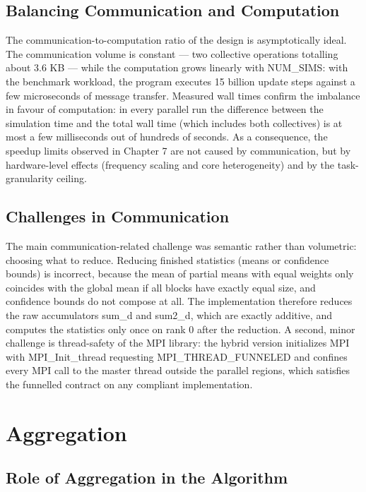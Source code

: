 \documentclass[12pt,a4paper]{article}
\begin{document}
\subsection{Balancing Communication and Computation}

The communication-to-computation ratio of the design is asymptotically
ideal. The communication volume is constant --- two collective
operations totalling about 3.6 KB --- while the computation grows
linearly with NUM\_SIMS: with the benchmark workload, the program
executes 15 billion update steps against a few microseconds of message
transfer. Measured wall times confirm the imbalance in favour of
computation: in every parallel run the difference between the simulation
time and the total wall time (which includes both collectives) is at
most a few milliseconds out of hundreds of seconds. As a consequence,
the speedup limits observed in Chapter 7 are not caused by
communication, but by hardware-level effects (frequency scaling and core
heterogeneity) and by the task-granularity ceiling.

\subsection{Challenges in Communication}

The main communication-related challenge was semantic rather than
volumetric: choosing what to reduce. Reducing finished statistics (means
or confidence bounds) is incorrect, because the mean of partial means with equal
weights only coincides with the global mean if all blocks have exactly
equal size, and confidence bounds do not compose at all. The
implementation therefore reduces the raw accumulators sum\_d and
sum2\_d, which are exactly additive, and computes the statistics only
once on rank 0 after the reduction. A second, minor challenge is
thread-safety of the MPI library: the hybrid version initializes MPI
with MPI\_Init\_thread requesting MPI\_THREAD\_FUNNELED and confines
every MPI call to the master thread outside the parallel regions, which
satisfies the funnelled contract on any compliant implementation.

\section{Aggregation}

\subsection{Role of Aggregation in the Algorithm}
\end{document}

